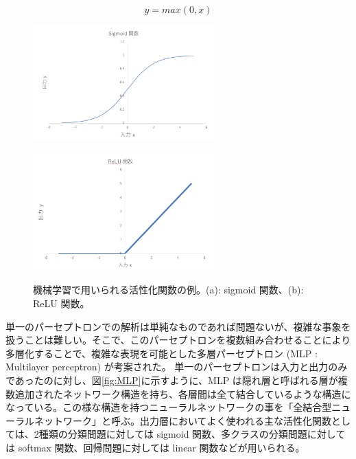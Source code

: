 \begin{equation}
    y = max(0,x)
    \label{equ:ReLU}
\end{equation}
\begin{figure}
    \centering
    \begin{minipage}[b]{0.4\linewidth}
        \centering
        \includegraphics[clip, width=7cm]{fig/4/sigmoid.png}
        \vspace{10pt}
        \subcaption{}
        \label{fig:sigmoid}
    \end{minipage}
    \hfill
    \begin{minipage}[b]{0.4\linewidth}
        \centering
        \includegraphics[clip, width=7cm]{fig/4/ReLU.png}
        \vspace{10pt}
        \subcaption{}
        \label{fig:ReLU}
    \end{minipage}
    \caption{機械学習で用いられる活性化関数の例。(a): sigmoid 関数、(b): ReLU 関数。}
    \label{fig:acctivation}
\end{figure}
単一のパーセプトロンでの解析は単純なものであれば問題ないが、複雑な事象を扱うことは難しい。そこで、このパーセプトロンを複数組み合わせることにより多層化することで、複雑な表現を可能とした多層パーセプトロン (MLP : Multilayer perceptron) が考案された。
単一のパーセプトロンは入力と出力のみであったのに対し、図\ref{fig:MLP}に示すように、MLP は隠れ層と呼ばれる層が複数追加されたネットワーク構造を持ち、各層間は全て結合しているような構造になっている。この様な構造を持つニューラルネットワークの事を「全結合型ニューラルネットワーク」と呼ぶ。出力層においてよく使われる主な活性化関数としては、2種類の分類問題に対しては sigmoid 関数、多クラスの分類問題に対しては softmax 関数、回帰問題に対しては linear 関数などが用いられる。

